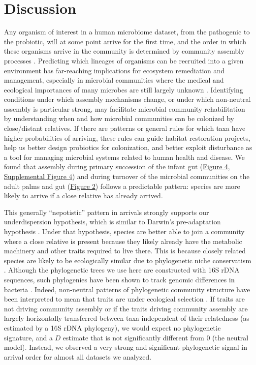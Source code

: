 \documentclass{article}
\begin{document}
\section{Discussion}
Any organism of interest in a human microbiome dataset, from the pathogenic to the probiotic, will at some point arrive for the first time, and the order in which these organisms arrive 
in the community is determined by community assembly processes \cite{Nemergut2013}. Predicting which lineages of organisms can be recruited into a given environment has far-reaching implications for ecosystem remediation and management, especially in microbial communities where the medical and ecological importances of many microbes are still largely unknown \cite{Martiny2015,Vazquez-Baeza2018}. Identifying conditions under which assembly mechanisms change, or under which non-neutral assembly is particular strong, may facilitate microbial community rehabilitation by understanding when and how microbial communities can be colonized by close/distant relatives. If there are patterns or general rules for which taxa have higher probabilities of arriving, these rules can guide habitat restoration projects, help us better design probiotics for colonization, and better exploit disturbance as a tool for managing microbial systems related to human health and disease. We found that assembly during primary succession of the infant gut (\hyperref[sec:figure4]{Figure 4}, \hyperref[sec:figureS4]{Supplemental Figure 4}) and during turnover of the microbial communities on the adult palms and gut (\hyperref[sec:figure2]{Figure 2}) follows a predictable pattern: species are more likely to arrive if a close relative has already arrived.
\par
This generally “nepotistic” pattern in arrivals strongly supports our underdispersion hypothesis, which is similar to Darwin’s pre-adaptation hypothesis \cite{Darwin1859}. Under that hypothesis, species are better able to join a community where a close relative is present because they likely already have the metabolic machinery and other traits required to live there. This is because closely related species are likely to be ecologically similar due to phylogenetic niche conservatism \cite{Wiens2010}. Although the phylogenetic trees we use here are constructed with 16S rDNA sequences, such phylogenies have been shown to track genomic differences in bacteria \cite{Zaneveld2010,Langille2013}. Indeed, non-neutral patterns of phylogenetic community structure have been interpreted to mean that traits are under ecological selection \cite{Webb2000,Webb2002,CavenderBares2004,Gerhold2015}. If traits are not driving community assembly \cite{Hubbell2001} or if the traits driving community assembly are largely horizontally transferred between taxa independent of their relatedness (as estimated by a 16S rDNA phylogeny), we would expect no phylogenetic signature, and a \(D\) estimate that is not significantly different from 0 (the neutral model). Instead, we observed a very strong and significant phylogenetic signal in arrival order for almost all datasets we analyzed.
\end{document}
